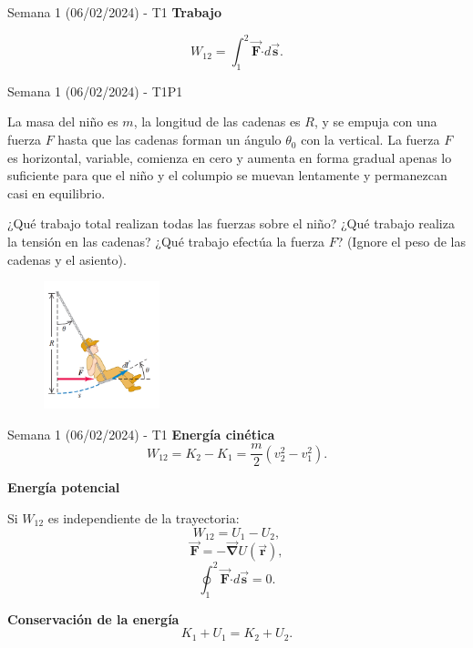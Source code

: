 \begin{frame}{Semana 1 (06/02/2024) - T1}
        \textbf{Trabajo}

        $$W_{12}=\int_{1}^{2}\vec{\boldsymbol{F}}\boldsymbol{\cdot} d\vec{\boldsymbol{s}}.$$
\end{frame}

\begin{frame}{Semana 1 (06/02/2024) - T1P1}

La masa del niño es $m$, la longitud
de las cadenas es $R$, y se empuja con una fuerza $F$ hasta que las cadenas forman un
ángulo $\theta_0$ con la vertical. La fuerza $F$ es horizontal, variable, comienza en cero y aumenta en forma gradual apenas lo suficiente para que el niño y el columpio se muevan lentamente y permanezcan casi en equilibrio.

¿Qué trabajo total realizan todas las
fuerzas sobre el niño? ¿Qué trabajo realiza la tensión en las cadenas? ¿Qué trabajo efectúa la fuerza $F$? (Ignore el peso
de las cadenas y el asiento).

\begin{figure}[H]
    \centering
    \includegraphics[width=0.3\textwidth]{figures/t1t1.png}
\end{figure}
    
\end{frame}

\begin{frame}{Semana 1 (06/02/2024) - T1}
    \textbf{Energía cinética}
    $$W_{12}=K_2-K_1=\frac{m}{2}\left(v_2^2-v_1^2\right).$$
    
    \textbf{Energía potencial}
    
    Si $W_{12}$ es independiente de la trayectoria:
    $$W_{12}=U_1-U_2,$$
    $$\vec{\boldsymbol{F}}=-\vec{\boldsymbol{\nabla}}U(\vec{\boldsymbol{r}}),$$
    $$\oint_1^2\vec{\boldsymbol{F}}\boldsymbol{\cdot} d\vec{\boldsymbol{s}}=0.$$
    
    \textbf{Conservación de la energía}
    $$K_1+U_1=K_2+U_2.$$
\end{frame}

